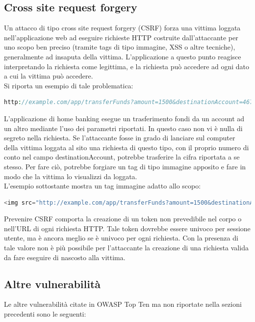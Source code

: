 \subsection{Cross site request forgery}
Un attacco di tipo cross site request forgery (CSRF) forza una vittima loggata nell'applicazione web ad eseguire richieste HTTP costruite dall'attaccante per uno scopo ben preciso (tramite tags di tipo immagine, XSS o altre tecniche), generalmente ad insaputa della vittima. L'applicazione a questo punto reagisce interpretando la richiesta come legittima, e la richiesta può accedere ad ogni dato a cui la vittima può accedere.\\
Si riporta un esempio di tale problematica:\\

\begin{lstlisting}[language=PHP]
http://example.com/app/transferFunds?amount=1500&destinationAccount=4673243243
\end{lstlisting}

L'applicazione di home banking esegue un trasferimento fondi da un account ad un altro mediante l'uso dei parametri riportati. In questo caso non vi è nulla di segreto nella richiesta. Se l'attaccante fosse in grado di lanciare sul computer della vittima loggata al sito una richiesta di questo tipo, con il proprio numero di conto nel campo destinationAccount, potrebbe trasferire la cifra riportata a se stesso. Per fare ciò, potrebbe forgiare un tag di tipo immagine apposito e fare in modo che la vittima lo visualizzi da loggata.\\
L'esempio sottostante mostra un tag immagine adatto allo scopo:\\

\begin{lstlisting}[language=PHP]
<img src="http://example.com/app/transferFunds?amount=1500&destinationAccount=attackersAcct#" width="0" height="0" />
\end{lstlisting}

Prevenire CSRF comporta la creazione di un token non prevedibile nel corpo o nell'URL di ogni richiesta HTTP. Tale token dovrebbe essere univoco per sessione utente, ma è ancora meglio se è univoco per ogni richiesta. Con la presenza di tale valore non è più possibile per l'attaccante la creazione di una richiesta valida da fare eseguire di nascosto alla vittima.

\subsection{Altre vulnerabilità}
Le altre vulnerabilità citate in OWASP Top Ten ma non riportate nella sezioni precedenti sono le seguenti:

